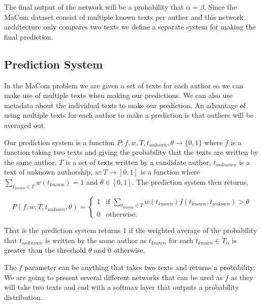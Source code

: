 The final output of the network will be a probability that $\alpha = \beta$.
Since the MaCom dataset consist of multiple known texts per author and this
network architecture only compares two texts we define a separate system for
making the final prediction.

\subsection{Prediction System}

In the MaCom problem we are given a set of texts for each author so we can make
use of multiple texts when making our predictions. We can also use metadata
about the individual texts to make our prediction. An advantage of using
multiple texts for each author to make a prediction is that outliers will be
averaged out.

\begin{definition}

    \label{def:prediction_system}

    Our prediction system is a function $P:f, w, T, t_{unkown}, \theta
    \rightarrow \{0, 1\}$ where $f$ is a function taking two texts and giving
    the probability that the texts are written by the same author, $T$ is a set
    of texts written by a candidate author, $t_{unknown}$ is a text of unknown
    authorship, $w:T \rightarrow [0,1]$ is a function where $\sum_{t_{known}
    \in T} w(t_{known}) = 1$ and $\theta \in [0,1]$. The prediction system then
    returns,

    \begin{equation}
        P(f, w, T, t_{unkown}, \theta) = \begin{cases}
            1 & \text{if } \sum_{t_{known} \in T} w(t_{known})
                f(t_{known}, t_{unkown}) > \theta \\
            0 & \text{otherwise}.
        \end{cases}
    \end{equation}

\end{definition}

That is the prediction system returns 1 if the weighted average of the
probability that $t_{unknown}$ is written by the same author as $t_{known}$
for each $t_{known} \in T_\alpha$ is greater than the threshold $\theta$ and 0
otherwise.

The $f$ parameter can be anything that takes two texts and returns a
probability. We are going to present several different networks that can be used
as $f$ as they will take two texts and end with a softmax layer that outputs a
probability distribution.


